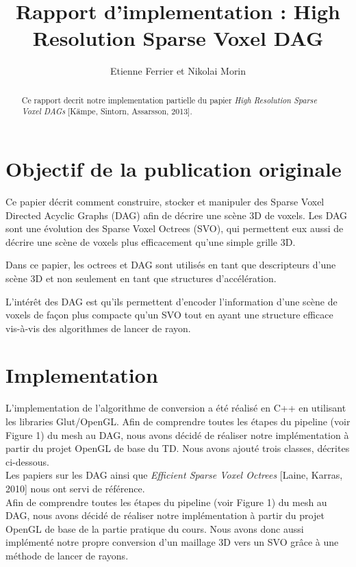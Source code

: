 \documentclass[a4paper]{article}
\title{Rapport d'implementation : High Resolution Sparse Voxel DAG}
\author{Etienne Ferrier et Nikolai Morin}
\date{}
\begin{document}
\maketitle

\begin{abstract}
Ce rapport decrit notre implementation partielle du papier \textit{High Resolution Sparse Voxel DAGs} [Kämpe, Sintorn, Assarsson, 2013].
\end{abstract}

\section{Objectif de la publication originale}
Ce papier décrit comment construire, stocker et manipuler des Sparse Voxel Directed Acyclic Graphs (DAG) afin de décrire une scène 3D de voxels. Les DAG sont une évolution des Sparse Voxel Octrees (SVO), qui permettent eux aussi de décrire une scène de voxels plus efficacement qu’une simple grille 3D.

Dans ce papier, les octrees et DAG sont utilisés en tant que descripteurs d’une scène 3D et non seulement en tant que structures d’accélération.

L’intérêt des DAG est qu’ils permettent d’encoder l’information d'une scène de voxels de façon plus compacte qu’un SVO tout en ayant une structure efficace vis-à-vis des algorithmes de lancer de rayon.


\section{Implementation}
L'implementation de l'algorithme de conversion a été réalisé en C++ en utilisant les libraries Glut/OpenGL. Afin de comprendre toutes les étapes du pipeline (voir Figure 1) du mesh au DAG, nous avons décidé de réaliser notre implémentation à partir du projet OpenGL de base du TD. Nous avons ajouté trois classes, décrites ci-dessous. \\

Les papiers sur les DAG ainsi que \textit{Efficient Sparse Voxel Octrees} [Laine, Karras, 2010] nous ont servi de référence. \\ 

Afin de comprendre toutes les étapes du pipeline (voir Figure 1) du mesh au DAG, nous avons décidé de réaliser notre implémentation à partir du projet OpenGL de base de la partie pratique du cours. Nous avons donc aussi implémenté notre propre conversion d’un maillage 3D vers un SVO grâce à une méthode de lancer de rayons.
\end{document}
